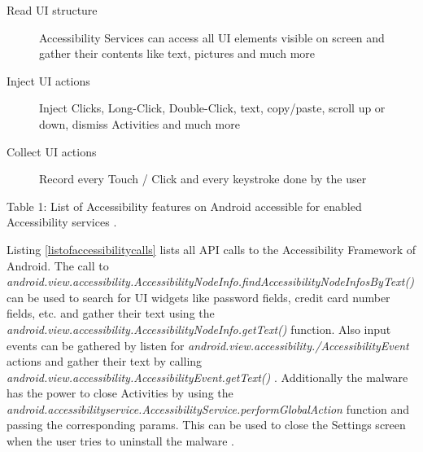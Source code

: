 \documentclass[10pt,titlepage]{article}
\begin{document}
\begin{description}
\item[Read UI structure] Accessibility Services can access all UI elements visible on screen and gather their contents like text, pictures and much more
\item[Inject UI actions] Inject Clicks, Long-Click, Double-Click, text, copy/paste, scroll up or down, dismiss Activities and much more
\item[Collect UI actions] Record every Touch / Click and every keystroke done by the user 
\end{description}
\begin{center}
Table 1: List of Accessibility features on Android accessible for enabled Accessibility services \cite{ExploitingAccessibilityInOperatingSystems}.
\end{center}

Listing \ref{listofaccessibilitycalls} lists all API calls to the Accessibility Framework of Android. The call to \textit{android.view.accessibility.AccessibilityNodeInfo.findAccessibilityNodeInfosByText()} can be used to search for UI widgets like password fields, credit card number fields, etc. and gather their text using the \textit{android.view.accessibility.AccessibilityNodeInfo.getText()} function. Also input events can be gathered by listen for \textit{android.view.accessibility./AccessibilityEvent} actions and gather their text by calling 
\\ \textit{android.view.accessibility.AccessibilityEvent.getText()} \cite[/reference/android/view/accessibility/AccessibilityRecord\#getText()]{AndroidDev}. Additionally the malware has the power to close Activities by using the 
\\ \textit{android.accessibilityservice.AccessibilityService.performGlobalAction} function and passing the corresponding params. This can be used to close the Settings screen when the user tries to uninstall the malware \cite[/reference/android/accessibilityservice/AccessibilityService\#performGlobalAction(int)]{AndroidDev}.
\end{document}
